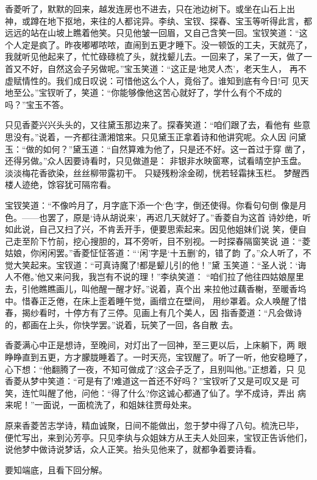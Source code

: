 香菱听了，默默的回来，越发连房也不进去，只在池边树下。或坐在山石上出
神，或蹲在地下抠地，来往的人都诧异。李纨、宝钗、探春、宝玉等听得此言，都
远远的站在山坡上瞧着他笑。只见他皱一回眉，又自己含笑一回。宝钗笑道：“这
个人定是疯了。昨夜嘟嘟哝哝，直闹到五更才睡下。没一顿饭的工夫，天就亮了，
我就听见他起来了，忙忙碌碌梳了头，就找颦儿去。一回来了，呆了一天，做了一
首又不好，自然这会子另做呢。”宝玉笑道：“这正是‘地灵人杰’，老天生人，
再不虚赋情性的。我们成日叹说：可惜他这么个人，竟俗了。谁知到底有今日!可
见天地至公。”宝钗听了，笑道：“你能够像他这苦心就好了，学什么有个不成的
吗？”宝玉不答。

只见香菱兴兴头头的，又往黛玉那边来了。探春笑道：“咱们跟了去，看他有
些意思没有。”说着，一齐都往潇湘馆来。只见黛玉正拿着诗和他讲究呢。众人因
问黛玉：“做的如何？”黛玉道：“自然算难为他了，只是还不好。这一首过于穿
凿了，还得另做。”众人因要诗看时，只见做道是：
非银非水映窗寒，试看晴空护玉盘。
淡淡梅花香欲染，丝丝柳带露初干。
只疑残粉涂金砌，恍若轻霜抹玉栏。
梦醒西楼人迹绝，馀容犹可隔帘看。

宝钗笑道：“不像吟月了，月字底下添一个‘色’字，倒还使得。你看句句倒
像是月色。——也罢了，原是‘诗从胡说来’，再迟几天就好了。”香菱自为这首
诗妙绝，听如此说，自己又扫了兴，不肯丢开手，便要思索起来。因见他姐妹们说
笑，便自己走至阶下竹前，挖心搜胆的，耳不旁听，目不别视。一时探春隔窗笑说
道：“菱姑娘，你闲闲罢。”香菱怔怔答道：“‘闲’字是‘十五删’的，错了韵
了。”众人听了，不觉大笑起来。宝钗道：“可真诗魔了!都是颦儿引的他！”黛
玉笑道：“圣人说：‘诲人不倦。’他又来问我，我岂有不说的理！”李纨笑道：
“咱们拉了他往四姑娘屋里去，引他瞧瞧画儿，叫他醒一醒才好。”说着，真个出
来拉他过藕香榭，至暖香坞中。惜春正乏倦，在床上歪着睡午觉，画缯立在壁间，
用纱罩着。众人唤醒了惜春，揭纱看时，十停方有了三停。见画上有几个美人，因
指香菱道：“凡会做诗的，都画在上头，你快学罢。”说着，玩笑了一回，各自散
去。

香菱满心中正是想诗，至晚间，对灯出了一回神，至三更以后，上床躺下，两
眼睁睁直到五更，方才朦胧睡着了。一时天亮，宝钗醒了。听了一听，他安稳睡了，
心下想：“他翻腾了一夜，不知可做成了?这会子乏了，且别叫他。”正想着，只
见香菱从梦中笑道：“可是有了!难道这一首还不好吗？”宝钗听了又是可叹又是
可笑，连忙叫醒了他，问他：“得了什么?你这诚心都通了仙了。学不成诗，弄出
病来呢！”一面说，一面梳洗了，和姐妹往贾母处来。

原来香菱苦志学诗，精血诚聚，日间不能做出，忽于梦中得了八句。梳洗已毕，
便忙写出，来到沁芳亭。只见李纨与众姐妹方从王夫人处回来，宝钗正告诉他们，
说他梦中做诗说梦话，众人正笑。抬头见他来了，就都争着要诗看。

要知端底，且看下回分解。